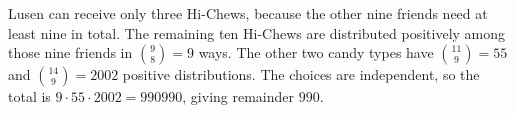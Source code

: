 Lusen can receive only three Hi-Chews, because the other nine friends need at least nine in total. The remaining ten Hi-Chews are distributed positively among those nine friends in $\binom98=9$ ways. The other two candy types have $\binom{11}{9}=55$ and $\binom{14}{9}=2002$ positive distributions. The choices are independent, so the total is $9\cdot55\cdot2002=990990$, giving remainder $\boxed{990}$.
